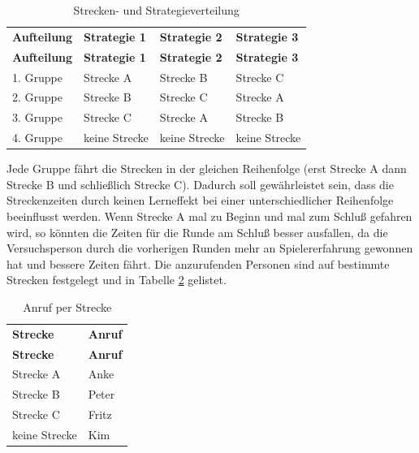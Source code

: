 \documentclass[12pt,a4paper]{scrartcl}
\begin{document}
\begin{longtable}{p{3cm}p{3cm}p{3cm}p{3cm} }
	\label{ablauf}\\
	\caption[Strecken- und Strategieverteilung]{Strecken- und Strategieverteilung}\\
	\hline
	\textbf{Aufteilung}&\textbf{Strategie 1}&\textbf{Strategie 2} &\textbf{Strategie 3}\\
	\hline
	\endfirsthead
	\hline
	\textbf{Aufteilung}&\textbf{Strategie 1}&\textbf{Strategie 2} &\textbf{Strategie 3}\\
	\hline
	\endhead
1. Gruppe & Strecke A & Strecke B & Strecke C \\
2. Gruppe & Strecke B & Strecke C & Strecke A \\
3. Gruppe  & Strecke C & Strecke A & Strecke B \\
4. Gruppe   & keine Strecke & keine Strecke & keine Strecke\\ 
\hline
\end{longtable}

Jede Gruppe fährt die Strecken in der gleichen Reihenfolge (erst Strecke A dann Strecke B und schließlich Strecke C). Dadurch soll gewährleistet sein, dass die Streckenzeiten durch keinen Lerneffekt bei einer unterschiedlicher Reihenfolge beeinflusst werden. Wenn Strecke A mal zu Beginn und mal zum Schluß gefahren wird, so könnten die Zeiten für die Runde am Schluß besser ausfallen, da die Versuchsperson durch die vorherigen Runden mehr an Spielererfahrung gewonnen hat und bessere Zeiten fährt. Die anzurufenden Personen sind auf bestimmte Strecken festgelegt und in Tabelle \ref{anrufstrecke} gelistet. 

\begin{longtable}{p{6cm}p{6cm}}
	\label{anrufstrecke}\\
	\caption[Anruf per Strecke]{Anruf per Strecke}\\
	\hline
	\textbf{Strecke} &	\textbf{Anruf}\\
	\hline
	\endfirsthead
	\hline
	\textbf{Strecke} &	\textbf{Anruf}\\
	\hline
	\endhead
Strecke A & Anke\\
Strecke B & Peter\\
Strecke C & Fritz\\
keine Strecke & Kim\\


\hline
\end{longtable}
\end{document}
